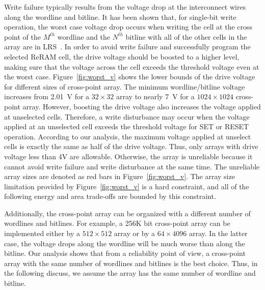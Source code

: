 Write failure typically results from the voltage drop at the interconnect
wires along the wordline and bitline. It has been shown that, for
single-bit write operation, the worst case voltage drop occurs when
writing the cell at the cross point of the $M^{th}$ wordline and the
$N^{th}$ bitline with all of the other cells in the array are in
LRS~\cite{crossbar_TED_2010}. In order to avoid write failure and
successfully program the selected ReRAM cell, the drive voltage should be
boosted to a higher level, making sure that the voltage across the cell
exceeds the threshold voltage even at the worst case.
Figure~\ref{fig:worst_v} shows the lower bounds of the drive voltage for
different sizes of cross-point array. The minimum wordline/bitline voltage
increases from 2.01~V for a $32 \times 32$ array to nearly 7~V for a $1024
\times 1024$ cross-point array. However, boosting the drive voltage also
increases the voltage applied at unselected cells. Therefore, a write
disturbance may occur when the voltage applied at an unselected cell
exceeds the threshold voltage for SET or RESET operation. According to our
analysis, the maximum voltage applied at unselect cells is exactly the
same as half of the drive voltage. Thus, only arrays with drive voltage
less than 4V are allowable. Otherwise, the array is unreliable because it
cannot avoid write failure and write disturbance at the same time. The
unreliable array sizes are denoted as red bars in
Figure~\ref{fig:worst_v}. The array size limitation provided by
Figure~\ref{fig:worst_v} is a hard constraint, and all of the following
energy and area trade-offs are bounded by this constraint.

Additionally, the cross-point array can be organized with a different
number of wordlines and bitlines. For example, a 256K bit cross-point
array can be implemented either by a $512 \times 512$ array or by a $64
\times 4096$ array. In the latter case, the voltage drops along the
wordline will be much worse than along the bitline. Our analysis shows
that from a reliability point of view, a cross-point array with the same
number of wordlines and bitlines is the best choice. Thus, in the
following discuss, we assume the array has the same number of wordline and
bitline.


